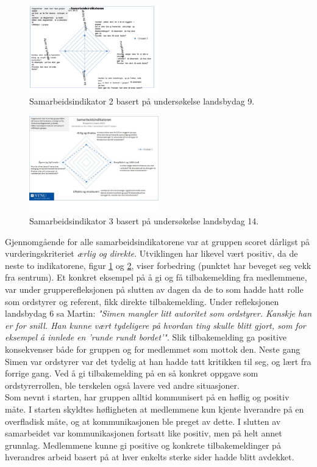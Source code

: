 \begin{figure}[h!]
\centering
    \includegraphics[width=0.5\textwidth]{Bilder/samarbeidsindikator_2.png}
 \caption{Samarbeidsindikator 2 basert på undersøkelse landsbydag 9.}
    \label{samind2}
\end{figure}

\begin{figure}[h!]
  \centering
    \includegraphics[width=0.5\textwidth]{Bilder/samarbeidsindikator_3.jpg}
    \caption{Samarbeidsindikator 3 basert på undersøkelse landsbydag 14.}
    \label{samind3}
\end{figure}

Gjennomgående for alle samarbeidsindikatorene var at gruppen scoret dårligst på vurderingskriteriet \textit{ærlig og direkte}. 
Utviklingen har likevel vært positiv, da de neste to indikatorene, figur \ref{samind2} og \ref{samind3}, viser forbedring (punktet har beveget seg vekk fra sentrum). 
Et konkret eksempel på å gi og få tilbakemelding fra medlemmene, var under grupperefleksjonen på slutten av dagen da de to som hadde hatt rolle som ordstyrer og referent, fikk direkte tilbakemelding.
Under refleksjonen landsbydag 6 sa Martin: \textit{"Simen mangler litt autoritet som ordstyrer. Kanskje han er for snill. Han kunne vært tydeligere på hvordan ting skulle blitt gjort, som for eksempel å innlede en 'runde rundt bordet'"}.
Slik tilbakemelding ga positive konsekvenser både for gruppen og for medlemmet som mottok den.
Neste gang Simen var ordstyrer var det tydelig at han hadde tatt kritikken til seg, og lært fra forrige gang.
Ved å gi tilbakemelding på en så konkret oppgave som ordstyrerrollen, ble terskelen også lavere ved andre situasjoner. \\

Som nevnt i starten, har gruppen alltid kommunisert på en høflig og positiv måte.
I starten skyldtes høfligheten at medlemmene kun kjente hverandre på en overfladisk måte, og at kommunikasjonen ble preget av dette.
I slutten av samarbeidet var kommunikasjonen fortsatt like positiv, men på helt annet grunnlag.
Medlemmene kunne gi positive og konkrete tilbakemeldinger på hverandres arbeid basert på at hver enkelts sterke sider hadde blitt avdekket.